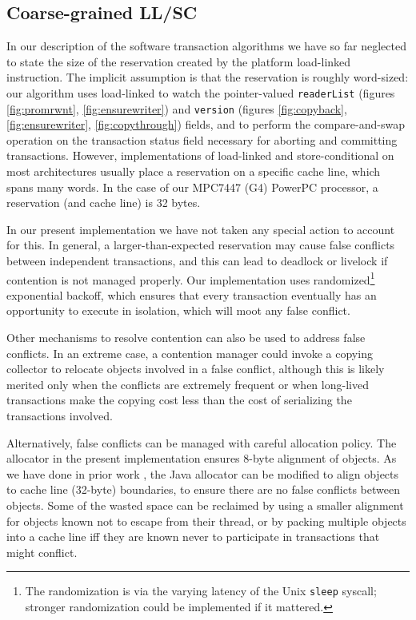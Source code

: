 \subsection{Coarse-grained LL/SC}\label{sec:coarseLL}
In our description of the software transaction algorithms we have so
far neglected to state the size of the reservation created by the
platform load-linked instruction.  The implicit assumption is that the
reservation is roughly word-sized: our algorithm uses load-linked to
watch the pointer-valued \texttt{readerList}
(figures \ref{fig:promrwnt}, \ref{fig:ensurewriter}) and
\texttt{version} (figures \ref{fig:copyback}, \ref{fig:ensurewriter},
\ref{fig:copythrough}) fields, and to perform the compare-and-swap
operation on the transaction status field necessary for aborting and
committing transactions.  However, implementations of load-linked and
store-conditional on most architectures usually place a reservation on
a specific cache line, which spans many words.  In the case of our
MPC7447 (G4) PowerPC processor, a reservation (and cache line) is 32
bytes.

In our present implementation we have not taken any special action to
account for this.  In general, a larger-than-expected reservation may
cause false conflicts between independent transactions, and this can
lead to deadlock or livelock if contention is not managed properly.
Our implementation uses randomized\footnote{The randomization is via
  the varying latency of the Unix \texttt{sleep} syscall; stronger
  randomization could be implemented if it mattered.}
 exponential backoff, which ensures that every transaction
 eventually has an opportunity to execute in isolation, which will
 moot any false conflict.

Other mechanisms to resolve contention can also be used to address
false conflicts.  In an extreme case, a contention manager could
invoke a copying collector to relocate objects involved in a false
conflict, although this is likely merited only when the conflicts are
extremely frequent or when long-lived transactions make the
copying cost less than the cost of serializing the transactions involved.

Alternatively, false conflicts can be managed with careful allocation
policy.  The allocator in the present implementation ensures 8-byte
alignment of objects.  As we have done in prior work
\cite{WitchelLaAnAs01}, the Java allocator can be modified to align
objects to cache line (32-byte) boundaries, to ensure there are no
false conflicts between objects.  Some of the wasted space can be
reclaimed by using a smaller alignment for objects known not to escape
from their thread, or by packing multiple objects into a cache line
iff they are known never to participate in transactions that might
conflict.

